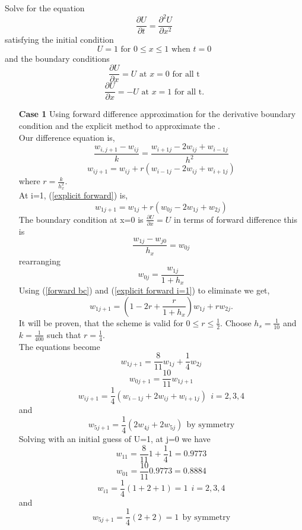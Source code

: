 \begin{example}
Solve for the equation
\[\frac{\partial U}{\partial t} =\frac{\partial^2 U}{\partial x^2} \]
satisfying the initial condition
\[U=1 \mbox{ for } 0\leq x \leq 1 \mbox{ when } t=0 \]
and the boundary conditions
\[\frac{\partial U}{\partial x} = U \mbox{ at } x=0 \mbox{ for all t} \]
\[\frac{\partial U}{\partial x} = -U \mbox{ at } x=1 \mbox{ for all t}. \]
\begin{itemize}
\item[\textbf{Case 1}] 
Using forward difference approximation for the derivative boundary condition
and the explicit method to approximate the .\\
Our difference equation is,
\[
\frac{w_{i,j+1}-w_{ij}}{k}=
\frac{w_{i+1j}-2w_{ij}+w_{i-1j}}{h^2}
\]
\begin{equation}
\label{explicit forward}
w_{ij+1}=w_{ij} +r(w_{i-1j}-2w_{ij}+w_{i+1j})
\end{equation}
where $r=\frac{k}{h^{2}_x}$.\\
At i=1, (\ref{explicit forward}) is,
\begin{equation}
\label{explicit forward i=1}
w_{1j+1}=w_{1j} +r(w_{0j}-2w_{1j}+w_{2j})
\end{equation}
The boundary condition at x=0 is $\frac{\partial U}{\partial x} = U$ in terms of
forward difference this is 
\[ \frac{w_{1j}-w_{j0}}{h_x} = w_{0j}\]
rearranging 
\begin{equation}
\label{forward bc}
w_{0j}=\frac{w_{1j}}{1+h_x}
\end{equation}
Using (\ref{forward bc}) and (\ref{explicit forward i=1}) to eliminate we get,
\[w_{1j+1} = \left(1-2r+\frac{r}{1+h_x}\right)w_{1j}+rw_{2j}.\]
It will be proven, that the scheme is valid for $0\leq r \leq \frac{1}{2}$.
Choose $h_s=\frac{1}{10}$ and $k=\frac{1}{400}$ such that $r=\frac{1}{4}$.\\
The equations become
\[w_{1j+1}=\frac{8}{11}w_{1j}+\frac{1}{4}w_{2j} \]
\[w_{0j+1}=\frac{10}{11}w_{1j+1}\]
\[w_{ij+1}=\frac{1}{4}(w_{i-1j}+2w_{ij}+w_{i+1j}) \ \ i=2,3,4 \]
and
\[w_{5j+1}=\frac{1}{4}(2w_{4j}+2w_{5j}) \ \ \mbox{by symmetry} \]
Solving with an initial guess of U=1, at j=0 we have
\[w_{11}=\frac{8}{11}1+\frac{1}{4}1=0.9773 \]
\[w_{01}=\frac{10}{11}0.9773=0.8884\]
\[w_{i1}=\frac{1}{4}(1+2+1)=1 \ \ i=2,3,4 \]
and
\[w_{5j+1}=\frac{1}{4}(2+2)=1 \ \ \mbox{by symmetry} \]


\end{itemize}
\end{example}
